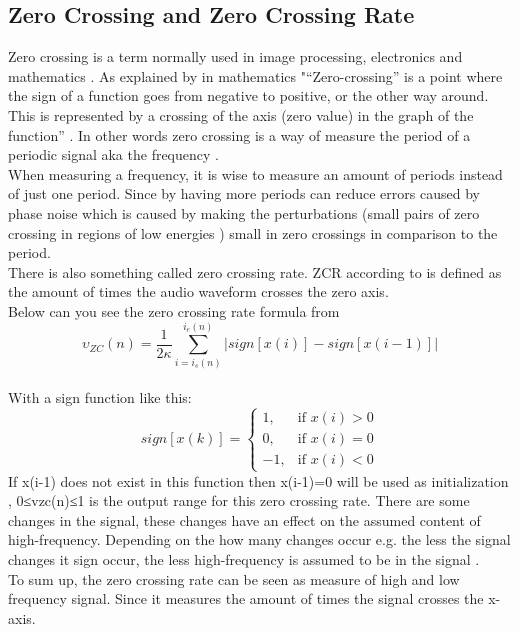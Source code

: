 \subsection{Zero Crossing and Zero Crossing Rate}
Zero crossing is a term normally used in image processing, electronics and mathematics \citep{AlZhrani2010}. As explained by \citep{AlZhrani2010} in mathematics "“Zero-crossing” is a point where the sign of a function goes from negative to positive, or the other way around. This is represented by a crossing of the axis (zero value) in the graph of the function” \citep{AlZhrani2010}.
In other words zero crossing is a way of measure the period of a periodic signal aka the frequency \citep{RWW2012}. \\
When measuring a frequency, it is wise to measure an amount of periods instead of just one period. Since by having more periods can reduce errors caused by phase noise \citep{RWW2012} which is caused by making the perturbations (small pairs of zero crossing in regions of low energies \citep{Mallat1988} ) small in zero crossings in comparison to the period. \citep{RWW2012} \\
There is also something called zero crossing rate. ZCR according to \citep{DSShete} is defined as the amount of times the audio waveform crosses the zero axis.\\
Below can you see the zero crossing rate formula from \citep{ACA} 
\begin{equation}\label{eq:ZCR}
\upsilon_{ZC}(n)= \frac{1}{2 \kappa}\sum_{i=i_s(n)}^{i_e (n)}|sign[x(i)]-sign[x(i-1)]|
\end{equation}
\\
With a sign function like this:
\begin{equation}
sign[x(k)]=
\begin{cases}
 1, & \text{if } x(i)>0\\ 
 0, & \text{if } x(i)=0\\
-1, & \text{if } x(i)<0
\end{cases}
\end{equation}
If x(i-1) does not exist in this function then x(i-1)=0 will be used as initialization \citep{ACA},
0≤vzc(n)≤1 is the output range for this zero crossing rate. There are some changes in the signal, these changes have an effect on the assumed content of high-frequency\citep{ACA}. Depending on the how many changes occur e.g. the less the signal changes it sign occur, the less high-frequency is assumed to be in the signal \citep{ACA}. \\
To sum up, the zero crossing rate can be seen as measure of high and low frequency signal. Since it measures the amount of times the signal crosses the x-axis.


